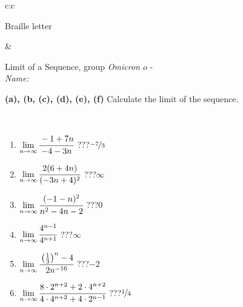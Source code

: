 \documentclass[10pt]{report}
\newcommand\omicron{o}
\begin{document}
\begin{tabular}{c:c}
\begin{minipage}[c][104.5mm][t]{0.5\linewidth}
\begin{center}
\begin{minipage}{0.20\linewidth}
\begin{center}
{\small Braille letter}
\end{center}
\end{minipage}
\end{center}
\end{minipage}
&
\begin{minipage}[c][104.5mm][t]{0.5\linewidth}
\begin{center}
\vspace{5mm}
{\huge Limit of a Sequence, group \textit{Omicron $\omicron$} -}\\[5mm]
\textit{Name:}\phantom{xxxxxxxxxxxxxxxxxxxxxxxxxxxxxxxxxxxxxxxxxxxxxxxxxxxxxxxxxxxxxxxxx}\\[5mm]
\begin{minipage}{0.95\linewidth}
\begin{center}
{
\textbf{(a), (b, (c), (d), (e), (f)} Calculate the limit of the sequence. \\[-1mm]
\phantom{x}
}
\end{center}
\end{minipage}
\\[1mm]
\begin{minipage}{0.79\linewidth}
\begin{center}
\begin{varwidth}{\linewidth}
\setlength{\itemsep}{0pt}
\begin{enumerate}
\normalsize
\item $\lim\limits_{n\to\infty}\cfrac{-1+7n}{-4-3n}$\quad \dotfill\; ???\;\dotfill \quad $\nicefrac{-7}{3}$
\item $\lim\limits_{n\to\infty}\cfrac{2(6+4n)}{(-3n+4)^2}$\quad \dotfill\; ???\;\dotfill \quad $\infty$
\item $\lim\limits_{n\to\infty}\cfrac{(-1-n)^2}{n^2-4n-2}$\quad \dotfill\; ???\;\dotfill \quad $0$
\item $\lim\limits_{n\to\infty}\cfrac{4^{n-1}}{4^{n+1}}$\quad \dotfill\; ???\;\dotfill \quad $\infty$
\item $\lim\limits_{n\to\infty}\cfrac{\left(\frac{1}{3}\right)^n -4}{2n^{-16}}$\quad \dotfill\; ???\;\dotfill \quad $-2$
\item $\lim\limits_{n\to\infty}\cfrac{8\cdot 2^{n+2}+2\cdot 4^{n+2}}{4\cdot 4^{n+2}+4\cdot 2^{n-1}}$\quad \dotfill\; ???\;\dotfill \quad $\nicefrac{1}{4}$
\end{enumerate}
\end{varwidth}
\end{center}
\end{minipage}
\begin{minipage}{0.20\linewidth}

\end{minipage}
\end{center}
\end{minipage}
\end{tabular}
\end{document}
